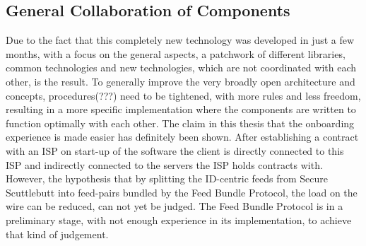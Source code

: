 \subsection{General Collaboration of Components}
Due to the fact that this completely new technology was developed in just a few months, with a focus on the general aspects, a patchwork of different libraries, common technologies and new technologies, which are not coordinated with each other, is the result. To generally improve the very broadly open architecture and concepts, procedures(???) need to be tightened, with more rules and less freedom, resulting in a more specific implementation where the components are written to function optimally with each other.  The claim in this thesis that the onboarding experience is made easier has definitely been shown. After establishing a contract with an ISP on start-up of the software the client is directly connected to this ISP and indirectly connected to the  servers the ISP holds contracts with. However, the hypothesis that by splitting the ID-centric feeds from Secure Scuttlebutt into feed-pairs bundled by the Feed Bundle Protocol, the load on the wire can be reduced, can not yet be judged. The Feed Bundle Protocol is in a preliminary stage, with not enough experience in its implementation, to achieve that kind of judgement.